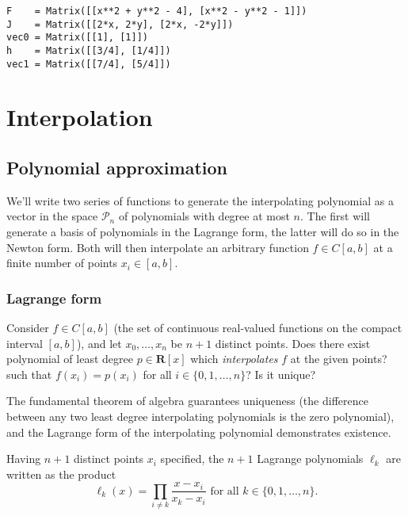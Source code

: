 \documentclass{article}
\begin{document}
    \begin{Verbatim}[fontsize=\small,commandchars=\\\{\}]
F    = Matrix([[x**2 + y**2 - 4], [x**2 - y**2 - 1]])
J    = Matrix([[2*x, 2*y], [2*x, -2*y]])
vec0 = Matrix([[1], [1]])
h    = Matrix([[3/4], [1/4]])
vec1 = Matrix([[7/4], [5/4]])

    \end{Verbatim}

    \hypertarget{interpolation}{%
\section{Interpolation}\label{interpolation}}

\hypertarget{polynomial-approximation}{%
\subsection{Polynomial approximation}\label{polynomial-approximation}}

We'll write two series of functions to generate the interpolating
polynomial as a vector in the space \(\mathcal{P}_n\) of polynomials
with degree at most \(n\). The first will generate a basis of
polynomials in the Lagrange form, the latter will do so in the Newton
form. Both will then interpolate an arbitrary function \(f \in C[a,b]\)
at a finite number of points \(x_i \in [a,b]\).

\hypertarget{lagrange-form}{%
\subsubsection{Lagrange form}\label{lagrange-form}}

Consider \(f \in C[a,b]\) (the set of continuous real-valued functions
on the compact interval \([a,b]\)), and let \(x_0,\ldots,x_n\) be
\(n+1\) distinct points. Does there exist polynomial of least degree
\(p \in \mathbf{R}[x]\) which \emph{interpolates} \(f\) at the given
points? such that \(f(x_i) = p(x_i)\) for all
\(i \in \{0,1,\ldots,n\}\)? Is it unique?

The fundamental theorem of algebra guarantees uniqueness (the difference
between any two least degree interpolating polynomials is the zero
polynomial), and the Lagrange form of the interpolating polynomial
demonstrates existence.

Having \(n+1\) distinct points \(x_i\) specified, the \(n+1\) Lagrange
polynomials \(\ell_k\) are written as the product
\[\ell_k(x) = \prod_{i\neq k} \frac{x-x_i}{x_k-x_i} \text{ for all } k \in \{0,1,\ldots,n\}.\]
\end{document}
